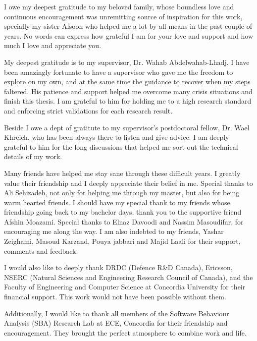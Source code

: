 I owe my deepest gratitude to my beloved family, whose
boundless love and continuous encouragement was unremitting source of inspiration
for this work, specially my sister Afsoon who helped me a lot by all means in the past couple of years.  No words can express how grateful I am for your love and support and
how much I love and appreciate you.

My deepest gratitude is to my supervisor, Dr. Wahab Abdelwahab-Lhadj. I have been amazingly fortunate to have a supervisor who gave me the freedom to explore on my own, and at the same time the guidance to recover when my steps faltered. His patience and support helped me overcome many crisis situations and finish this thesis. I am grateful to him for holding me to a high research standard and enforcing strict validations for each research result.

Beside I owe a dept of gratitute to my supervisor's postdoctoral fellow, Dr. Wael Khreich, who has been always there to listen and give advice. I am deeply grateful to him for the long discussions that helped me sort out the technical details of my work. 

Many friends have helped me stay sane through these difficult years. I greatly value their friendship and I deeply appreciate their belief in me. Special thanks to Ali Sehizadeh, not only for helping me through my master, but also for being warm hearted friends. I should have my special thank to my friends whose friendship going back to my bachelor days, thank you to the supportive friend Afshin Moazami.
Special thanks to Elnaz Davoodi and Nassim Masoudifar, for encouraging me along the way.
I am also indebted to my friends, Yashar Zeighami, Masoud Karzand, Pouya jabbari and Majid Laali for their support, comments and feedback.

I would also like to deeply thank DRDC (Defence R\&D Canada), Ericsson, NSERC (Natural Sciences and Engineering Research Council of Canada), and the Faculty of Engineering and Computer Science at Concordia University for their financial support. This work would not have been possible without them.

Additionally, I would like to thank all members of the Software Behaviour Analysis (SBA) Research Lab at ECE, Concordia for their friendship and encouragement. They brought the perfect atmosphere to combine work and life.

